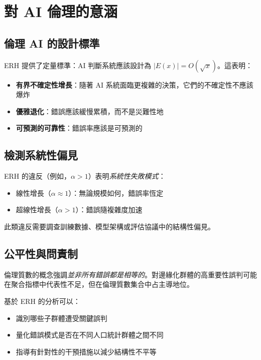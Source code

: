 \documentclass[12pt,a4paper]{article}
\theoremstyle{definition}
\theoremstyle{remark}
\begin{document}
\section{對 AI 倫理的意涵}
\label{sec:implications}

\subsection{倫理 AI 的設計標準}

ERH 提供了定量標準：AI 判斷系統應該設計為 $|E(x)| = O(\sqrt{x})$。這表明：

\begin{itemize}
    \item \textbf{有界不確定性增長}：隨著 AI 系統面臨更複雜的決策，它們的不確定性不應該爆炸
    \item \textbf{優雅退化}：錯誤應該緩慢累積，而不是災難性地
    \item \textbf{可預測的可靠性}：錯誤率應該是可預測的
\end{itemize}

\subsection{檢測系統性偏見}

ERH 的違反（例如，$\alpha > 1$）表明\emph{系統性失敗模式}：
\begin{itemize}
    \item 線性增長（$\alpha \approx 1$）：無論規模如何，錯誤率恆定
    \item 超線性增長（$\alpha > 1$）：錯誤隨複雜度加速
\end{itemize}

此類違反需要調查訓練數據、模型架構或評估協議中的結構性偏見。

\subsection{公平性與問責制}

倫理質數的概念強調\emph{並非所有錯誤都是相等的}。對邊緣化群體的高重要性誤判可能在聚合指標中代表性不足，但在倫理質數集合中占主導地位。

基於 ERH 的分析可以：
\begin{itemize}
    \item 識別哪些子群體遭受關鍵誤判
    \item 量化錯誤模式是否在不同人口統計群體之間不同
    \item 指導有針對性的干預措施以減少結構性不平等
\end{itemize}
\end{document}
